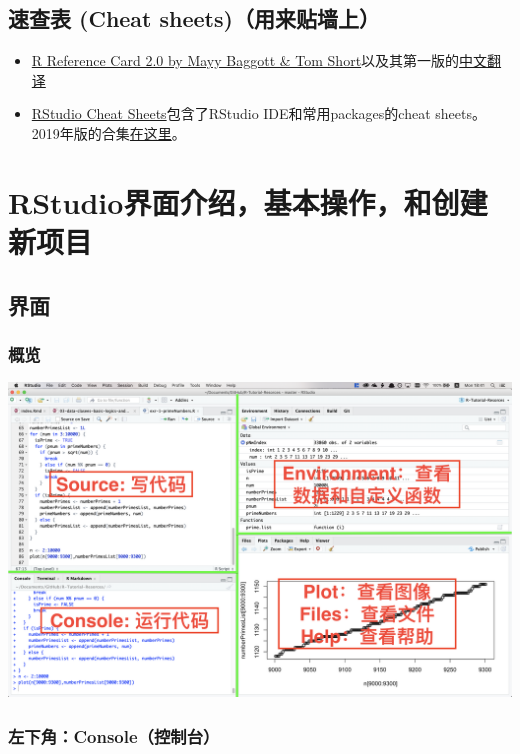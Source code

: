 \documentclass[]{book}
\providecommand{\tightlist}{%
  \setlength{\itemsep}{0pt}\setlength{\parskip}{0pt}}
\begin{document}
\hypertarget{-cheat-sheets}{%
\section{速查表 (Cheat sheets)（用来贴墙上）}\label{-cheat-sheets}}

\begin{itemize}
\tightlist
\item
  \href{https://cran.r-project.org/doc/contrib/Baggott-refcard-v2.pdf}{R Reference Card 2.0 by Mayy Baggott \& Tom Short}以及其第一版的\href{https://cran.r-project.org/doc/contrib/Liu-R-refcard.pdf}{中文翻译}
\item
  \href{https://www.rstudio.com/resources/cheatsheets/}{RStudio Cheat Sheets}包含了RStudio IDE和常用packages的cheat sheets。2019年版的合集\href{https://www.rstudio.com/wp-content/uploads/2019/01/Cheatsheets_2019.pdf}{在这里}。
\end{itemize}

\hypertarget{ch2}{%
\chapter{RStudio界面介绍，基本操作，和创建新项目}\label{ch2}}

\section{界面}

\subsection{概览}

\includegraphics[width=46.67in]{img/01-interface}

\hypertarget{console}{%
\subsection{左下角：Console（控制台）}\label{console}}
\end{document}
